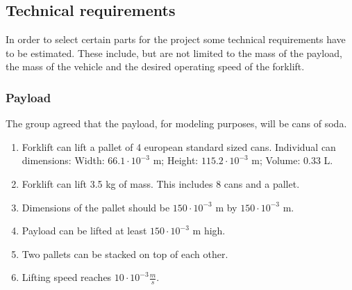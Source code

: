 \documentclass[../report.tex]{subfiles}
\begin{document}
    \subsection{Technical requirements}
        In order to select certain parts for the project some technical requirements 
        have to be estimated. These include, but are not limited to the mass of the 
        payload, the mass of the vehicle and the desired operating speed of the 
        forklift.

        \subsubsection{Payload} %
           The group agreed that the payload, for modeling purposes, will be cans of soda.
           \begin{center}
                \begin{enumerate}
                    \item Forklift can lift a pallet of 4 european standard sized cans. Individual can dimensions: Width: $66.1 \cdot 10^{-3}$ m; Height: $115.2 \cdot 10^{-3}$ m; Volume: 0.33 L. %
                    \item Forklift can lift  3.5 kg of mass. This includes 8 cans and a pallet. %
                    \item Dimensions of the pallet should be $150 \cdot 10^{-3}$ m by $150 \cdot 10^{-3}$ m. %
                    \item Payload can be lifted at least $150 \cdot 10^{-3}$ m high. %
                    \item Two pallets can be stacked on top of each other.
                    \item Lifting speed reaches $10 \cdot 10^{-3} \frac{m}{s}$. %
                \end{enumerate}
            \end{center}
\end{document}
